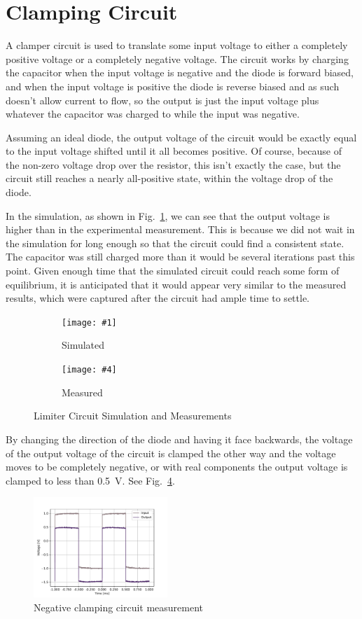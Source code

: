 \documentclass{../../ece-report}
\newcommand{\twosubfigures}[6]{
  \begin{subfigure}{0.45\textwidth}
    \texttt{[image: \#1]}
    \caption{#2}
    \label{#3}
  \end{subfigure}
  \begin{subfigure}{0.45\textwidth}
    \texttt{[image: \#4]}
    \caption{#5}
    \label{#6}
  \end{subfigure}
}
\begin{document}
\section{Clamping Circuit}

A clamper circuit is used to translate some input voltage
to either a completely positive voltage or a completely
negative voltage. The circuit works by charging the
capacitor when the input voltage is negative and the
diode is forward biased, and when the input voltage
is positive the diode is reverse biased and as such
doesn't allow current to flow, so the output is just
the input voltage plus whatever the capacitor was charged
to while the input was negative. 

Assuming an ideal diode, the output voltage of the circuit
would be exactly equal to the input voltage shifted
until it all becomes positive. Of course, because of
the non-zero voltage drop over the resistor, this isn't
exactly the case, but the circuit still reaches a nearly
all-positive state, within the voltage drop of the diode.

In the simulation, as shown in Fig.~\ref{fig:c_simulated},
we can see that the output voltage is higher than in
the experimental measurement. This is because we did
not wait in the simulation for long enough so that the
circuit could find a consistent state. The capacitor
was still charged more than it would be several iterations
past this point. Given enough time that the simulated
circuit could reach some form of equilibrium, it is
anticipated that it would appear very similar to the
measured results, which were captured after the circuit
had ample time to settle.

\begin{figure}[h!]
  \centering
  \twosubfigures{../plots/circuit_c/pdf/c_sim_trans.pdf}{Simulated}{fig:c_simulated}
                {../plots/circuit_c/pdf/c_meas_trans.pdf}{Measured}{fig:c_measured}
  \caption{Limiter Circuit Simulation and Measurements}
  \label{fig:clamped_results}
\end{figure}

By changing the direction of the diode and having it
face backwards, the voltage of the output voltage of
the circuit is clamped the other way and the voltage
moves to be completely negative, or with real components
the output voltage is clamped to less than 0.5~\si{\V}.
See Fig.~\ref{fig:negative_clamped_results}.

\begin{figure}[h!]
  \centering
  \includegraphics[width=0.45\textwidth]{../plots/circuit_c/pdf/c_meas_-0_7.pdf}
  \caption{Negative clamping circuit measurement}
  \label{fig:negative_clamped_results}
\end{figure}
\end{document}
